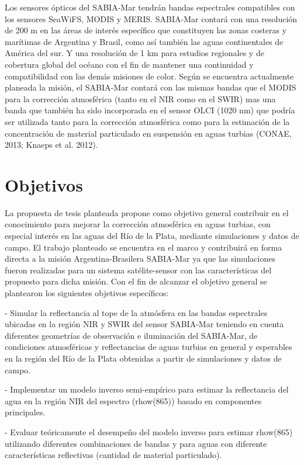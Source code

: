 Los sensores ópticos del SABIA-Mar tendrán bandas espectrales compatibles con los sensores SeaWiFS, MODIS y MERIS. SABIA-Mar contará con una resolución de 200 m en las áreas de interés específico que constituyen las zonas costeras y marítimas de Argentina y Brasil, como así también las aguas continentales de América del sur. Y una resolución de 1 km para estudios regionales y de cobertura global del océano con el fin de mantener una continuidad y compatibilidad con las demás misiones de color. Según se encuentra actualmente planeada la misión, el SABIA-Mar contará con las mismas bandas que el MODIS para la corrección atmosférica (tanto en el NIR como en el SWIR) mas una banda que también ha sido incorporada en el sensor OLCI (1020 nm) que podría ser utilizada tanto para la corrección atmosférica como para la estimación de la concentración de material particulado en suspensión en aguas turbias (CONAE, 2013; Knaeps et al. 2012). 

\section{Objetivos}

La propuesta de tesis planteada propone como objetivo general contribuir en el conocimiento para mejorar la corrección atmosférica en aguas turbias, con especial interés en las aguas del Río de la Plata, mediante simulaciones y datos de campo. El trabajo planteado se encuentra en el marco y contribuirá en forma directa a la misión Argentina-Brasilera SABIA-Mar ya que las simulaciones fueron realizadas para un sistema satélite-sensor con las características del propuesto para dicha misión. Con el fin de alcanzar el objetivo general se plantearon los siguientes objetivos específicos:

- Simular la reflectancia al tope de la atmósfera en las bandas espectrales ubicadas en la región NIR y SWIR del sensor SABIA-Mar teniendo en cuenta diferentes geometrías de observación e iluminación del SABIA-Mar, de condiciones atmosféricas y reflectancias de aguas turbias en general y esperables en la región del Río de la Plata obtenidas a partir de simulaciones y datos de campo.

- Implementar un modelo inverso semi-empírico para estimar la reflectancia del agua en la región NIR del espectro (rhow(865)) basado en componentes principales.

- Evaluar teóricamente el desempeño del modelo inverso para estimar rhow(865) utilizando diferentes combinaciones de bandas y para aguas con diferente características reflectivas (cantidad de material particulado).

